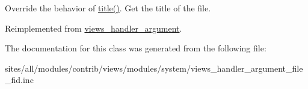 Override the behavior of \hyperlink{classviews__handler__argument__file__fid_b6dbcee36a0d890e870b01259f8ed35e}{title()}. Get the title of the file. 

Reimplemented from \hyperlink{classviews__handler__argument_76181ac24e7be4a09aaafc1fa5f15ea1}{views\_\-handler\_\-argument}.

The documentation for this class was generated from the following file:\begin{CompactItemize}
\item 
sites/all/modules/contrib/views/modules/system/views\_\-handler\_\-argument\_\-file\_\-fid.inc\end{CompactItemize}
